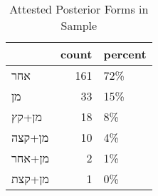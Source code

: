 \begin{table}[htbp!]
\centering
\caption{Attested Posterior Forms in Sample}
\label{table:post_front}
\begin{tabular}{lrl}
\toprule
{} &  count & percent \\
\midrule
\texthebrew{אחר}    &    161 &     72\% \\
\texthebrew{מן}     &     33 &     15\% \\
\texthebrew{מן+קץ}  &     18 &      8\% \\
\texthebrew{מן+קצה} &     10 &      4\% \\
\texthebrew{מן+אחר} &      2 &      1\% \\
\texthebrew{מן+קצת} &      1 &      0\% \\
\bottomrule
\end{tabular}
\end{table}
